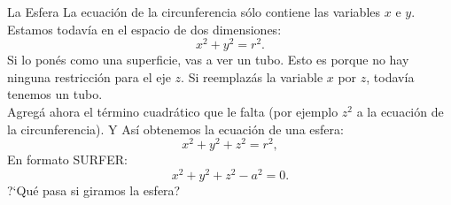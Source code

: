 \begin{surferPage}{La Esfera}
La ecuaci{\'o}n de la circunferencia s{\'o}lo contiene las variables $x$ e $y$. Estamos todav{\'i}a en el espacio de dos dimensiones:
\[x^2+y^2=r^2.\]
Si lo pon{\'e}s como una superficie, vas a ver un tubo. Esto es porque no hay ninguna restricci{\'o}n para el eje $z$. Si reemplaz{\'a}s la variable $x$ por $z$, todav{\'i}a tenemos un tubo.\\
Agreg{\'a} ahora el t{\'e}rmino cuadr{\'a}tico que le falta (por ejemplo $z^2$ a la ecuaci{\'o}n de la circunferencia). 
Y As{\'i} obtenemos la ecuaci{\'o}n de una esfera:
\[x^2+y^2+z^2=r^2,\]
En formato SURFER:
\[x^2+y^2+z^2-a^2=0.\]
?`Qu{\'e} pasa si giramos la esfera?
\end{surferPage}
